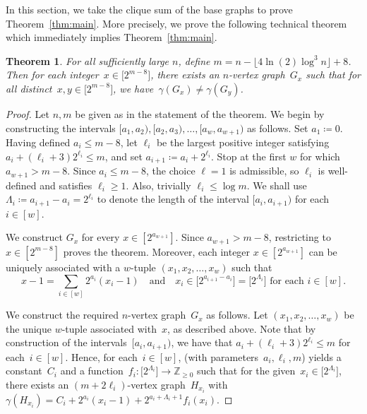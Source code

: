 \documentclass[11pt, final]{article}
\newtheorem{theorem}{Theorem}[section]
\theoremstyle{definition}
\begin{document}
In this section, we take the clique sum of the base graphs to prove Theorem~\ref{thm:main}. More precisely, we prove the following technical theorem which immediately implies Theorem~\ref{thm:main}. 

\begin{theorem}
    For all sufficiently large $n$, define $m = n-\lfloor 4\ln(2)\log^3n\rfloor +8$. Then for each integer~$x \in \bigl[2^{m-8}\bigr]$, there exists an $n$-vertex graph~$G_x$ such that for all distinct~$x, y\in \bigl[2^{m-8}\bigr]$, we have~$\gamma(G_x)\neq \gamma(G_y)$. 
\end{theorem}

\begin{proof}
    \setcounter{equation}{0}
    Let $n, m$ be given as in the statement of the theorem. We begin by constructing the intervals $[a_1,a_2), [a_2,a_3),\dots,[a_w,a_{w+1})$ as follows. Set $a_1\coloneqq0$. Having defined $a_i\le m-8$, let $\ell_i$ be the largest positive integer satisfying $a_{i}+(\ell_i+3)2^{\ell_i}\leq m$, and set     
    $a_{i+1} \coloneqq a_{i}+2^{\ell_i}$. Stop at the first $w$ for  which $a_{w+1}>m-8$. Since $a_i\le m-8$, the choice $\ell=1$ is admissible, so $\ell_i$ is well-defined and satisfies $\ell_i \geq 1$. Also, trivially  $\ell_i\leq \log m$. We shall use~$\Lambda_i\coloneqq a_{i+1}-a_i = 2^{\ell_i}$ to denote the length of the interval $[a_i, a_{i+1})$ for each $i \in [w]$.

    We construct $G_x$ for every $x\in[2^{a_{w+1}}]$.
Since $a_{w+1}>m-8$, restricting to
$x\in[2^{m-8}]$ proves the theorem. Moreover, each integer $x \in [2^{a_{w+1}}]$ can be uniquely associated with a $w$-tuple $(x_1, x_2, \dots, x_w)$ such that 
    \begin{equation}
        x-1=\sum_{i \in [w]} 2^{a_i}(x_i-1)\quad \text{and} \quad x_i\in \bigl[2^{a_{i+1}-a_i}\bigr] = \bigl[2^{\Lambda_i}\bigr] \text{ for each $i \in [w]$.}\label{eqTH1}
    \end{equation} 
    
    We construct the required $n$-vertex graph~$G_x$ as follows. Let $(x_1, x_2, \dots, x_w)$ be the unique $w$-tuple associated with~$x$, as described above. Note that by construction of the intervals~$[a_i, a_{i+1})$, we have that $a_i + (\ell_i + 3)2^{\ell_i} \leq m$ for each~$i \in [w]$. Hence, for each~$i \in [w]$,  (with parameters~$a_i, \ell_i,m$) yields a constant~$C_i$ and a function~$f_i:\bigl[2^{\Lambda_i}\bigr]\to \mathbb{Z}_{\ge0}$ such that for the given~$x_i\in \bigl[2^{\Lambda_i}\bigr]$, there exists an $(m+2\ell_i)$-vertex graph~$H_{x_i}$ with $ \gamma(H_{x_i}) = C_i+2^{a_i}(x_i-1)+2^{a_i+\Lambda_i+1}f_i(x_i)$.


\end{proof}
\end{document}
